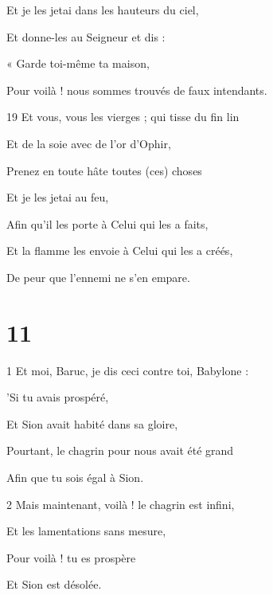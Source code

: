 \par Et je les jetai dans les hauteurs du ciel,

\par Et donne-les au Seigneur et dis :

\par « Garde toi-même ta maison,

\par Pour voilà ! nous sommes trouvés de faux intendants.

\par 19 Et vous, vous les vierges ; qui tisse du fin lin

\par Et de la soie avec de l'or d'Ophir,

\par Prenez en toute hâte toutes (ces) choses

\par Et je les jetai au feu,

\par Afin qu'il les porte à Celui qui les a faits,

\par Et la flamme les envoie à Celui qui les a créés,

\par De peur que l'ennemi ne s'en empare.

\chapter{11}

\par 1 Et moi, Baruc, je dis ceci contre toi, Babylone :

\par 'Si tu avais prospéré,

\par Et Sion avait habité dans sa gloire,

\par Pourtant, le chagrin pour nous avait été grand

\par Afin que tu sois égal à Sion.

\par 2 Mais maintenant, voilà ! le chagrin est infini,

\par Et les lamentations sans mesure,

\par Pour voilà ! tu es prospère

\par Et Sion est désolée.


